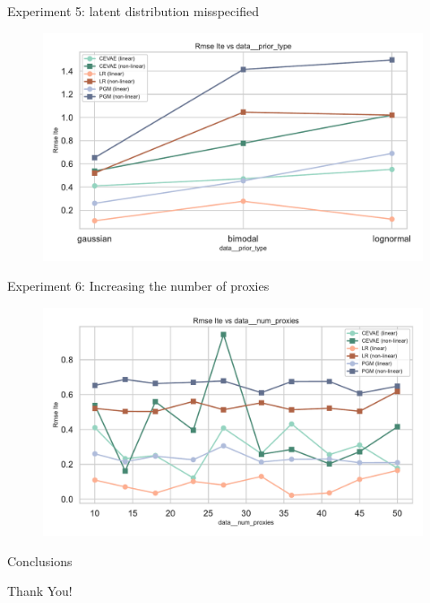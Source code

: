 \documentclass[10pt]{beamer}
\begin{document}
\begin{frame}{Experiment 5: latent distribution misspecified}
    \begin{figure}[H]
      \includegraphics[width=\textwidth]{../src/results/MyRun_data__prior_type--rmse_ite.pdf}
    \end{figure}
\end{frame}

\begin{frame}{Experiment 6: Increasing the number of proxies}
    \begin{figure}[H]
      \includegraphics[width=\textwidth]{../src/results/MyRun_data__num_proxies--rmse_ite.pdf}
    \end{figure}
\end{frame}

\begin{frame}{Conclusions}

\end{frame}

{
\begin{frame}[standout]
\thispagestyle{empty}
  {\LARGE Thank You!}
\end{frame}
}
\end{document}
